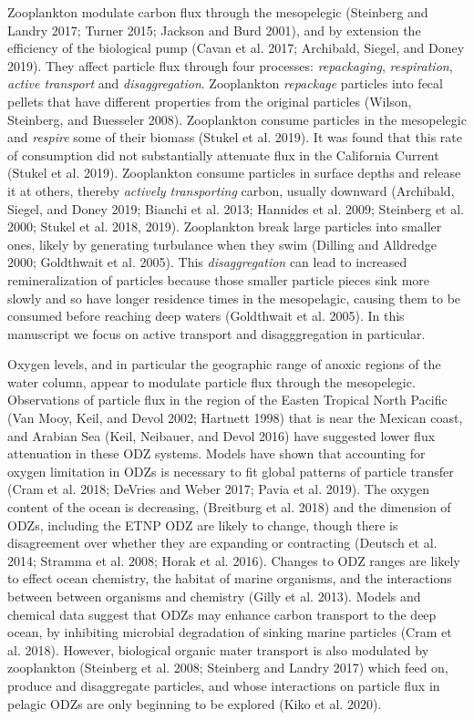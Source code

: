 \documentclass[]{article}
\begin{document}
Zooplankton modulate carbon flux through the mesopelegic (Steinberg and
Landry 2017; Turner 2015; Jackson and Burd 2001), and by extension the
efficiency of the biological pump (Cavan et al. 2017; Archibald, Siegel,
and Doney 2019). They affect particle flux through four processes:
\emph{repackaging}, \emph{respiration}, \emph{active transport} and
\emph{disaggregation}. Zooplankton \emph{repackage} particles into fecal
pellets that have different properties from the original particles
(Wilson, Steinberg, and Buesseler 2008). Zooplankton consume particles
in the mesopelegic and \emph{respire} some of their biomass (Stukel et
al. 2019). It was found that this rate of consumption did not
substantially attenuate flux in the California Current (Stukel et al.
2019). Zooplankton consume particles in surface depths and release it at
others, thereby \emph{actively transporting} carbon, usually downward
(Archibald, Siegel, and Doney 2019; Bianchi et al. 2013; Hannides et al.
2009; Steinberg et al. 2000; Stukel et al. 2018, 2019). Zooplankton
break large particles into smaller ones, likely by generating turbulance
when they swim (Dilling and Alldredge 2000; Goldthwait et al. 2005).
This \emph{disaggregation} can lead to increased remineralization of
particles because those smaller particle pieces sink more slowly and so
have longer residence times in the mesopelagic, causing them to be
consumed before reaching deep waters (Goldthwait et al. 2005). In this
manuscript we focus on active transport and disagggregation in
particular.

Oxygen levels, and in particular the geographic range of anoxic regions
of the water column, appear to modulate particle flux through the
mesopelegic. Observations of particle flux in the region of the Easten
Tropical North Pacific (Van Mooy, Keil, and Devol 2002; Hartnett 1998)
that is near the Mexican coast, and Arabian Sea (Keil, Neibauer, and
Devol 2016) have suggested lower flux attenuation in these ODZ systems.
Models have shown that accounting for oxygen limitation in ODZs is
necessary to fit global patterns of particle transfer (Cram et al. 2018;
DeVries and Weber 2017; Pavia et al. 2019). The oxygen content of the
ocean is decreasing, (Breitburg et al. 2018) and the dimension of ODZs,
including the ETNP ODZ are likely to change, though there is
disagreement over whether they are expanding or contracting (Deutsch et
al. 2014; Stramma et al. 2008; Horak et al. 2016). Changes to ODZ ranges
are likely to effect ocean chemistry, the habitat of marine organisms,
and the interactions between between organisms and chemistry (Gilly et
al. 2013). Models and chemical data suggest that ODZs may enhance carbon
transport to the deep ocean, by inhibiting microbial degradation of
sinking marine particles (Cram et al. 2018). However, biological organic
mater transport is also modulated by zooplankton (Steinberg et al. 2008;
Steinberg and Landry 2017) which feed on, produce and disaggregate
particles, and whose interactions on particle flux in pelagic ODZs are
only beginning to be explored (Kiko et al. 2020).
\end{document}
